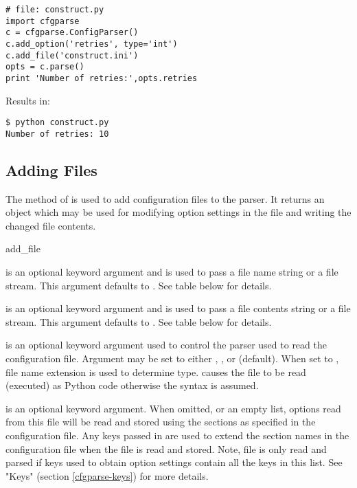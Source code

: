 \documentclass{howto}
\begin{document}
\begin{verbatim}
# file: construct.py
import cfgparse
c = cfgparse.ConfigParser()
c.add_option('retries', type='int')
c.add_file('construct.ini')
opts = c.parse()
print 'Number of retries:',opts.retries
\end{verbatim}

Results in:
\begin{verbatim}
$ python construct.py
Number of retries: 10
\end{verbatim}

\subsection{Adding Files\label{cfgparse-adding-files}}
    
The  method of  is used to add configuration 
files to the parser.  It returns an object which may be used for modifying
option settings in the file and writing the changed file contents.

  \begin{funcdesc}{add_file}{}

     is an optional keyword argument and is used to pass a file
        name string or a file stream.  This argument defaults to .
        See table below for details.
        
     is an optional keyword argument and is used to pass a file
        contents string or a file stream.  This argument defaults to 
        .  See table below for details.
        
     is an optional keyword argument used to control the parser
        used to read the configuration file.  Argument may be set to either
        , , or  (default).  When set to 
        , file name extension is used to determine type.  
         causes the file to be read (executed) as Python code 
        otherwise the  syntax is assumed.
    
     is an optional keyword argument.  When omitted,  
        or an empty list, options read from this file will be
        read and stored using the sections as specified in the configuration
        file.  Any keys passed in are used to extend the section names in the
        configuration file when the file is read and stored.  Note, file is
        only read and parsed if keys used to obtain option settings contain 
        all the keys in this list.  See "Keys" (section 
        \ref{cfgparse-keys}) for more details.
  \end{funcdesc}
\end{document}
